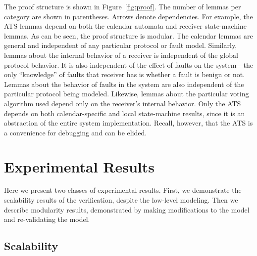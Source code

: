 \documentclass{llncs/llncs}
\begin{document}
{The proof structure is shown in Figure~\ref{fig:proof}. The number of lemmas per category are shown in parentheses. Arrows denote dependencies. For example, the ATS lemmas depend on both the calendar automata and receiver state-machine lemmas. As can be seen, the proof structure is modular. The calendar lemmas are general and independent of any particular protocol or fault model. Similarly, lemmas about the internal behavior of a receiver is independent of the global protocol behavior. It is also independent of the effect of faults on the system---the only ``knowledge'' of faults that receiver has is whether a fault is benign or not. Lemmas about the behavior of faults in the system are also independent of the particular protocol being modeled. Likewise, lemmas about the particular voting algorithm used depend only on the receiver's internal behavior. Only the ATS depends on both calendar-specific and local state-machine results, since it is an abstraction of the entire system implementation. Recall, however, that the ATS is a convenience for debugging and can be elided.

\section{Experimental Results}\label{sec:experimental}

Here we present two classes of experimental results. First, we demonstrate the scalability results of the verification, despite the low-level modeling. Then we describe modularity results, demonstrated by making modifications to the model and re-validating the model.

\subsection{Scalability}

}
\end{document}
